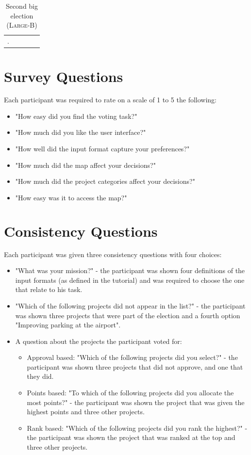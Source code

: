 \documentclass[letterpaper]{article} %
\begin{document}
\begin{longtable}[ht!]{|p{2cm}|p{8cm}|p{3cm}|p{1cm}|p{2cm}|}
     \hline
  \caption{Second big election (\textsc{Large-B})}\label{tab:fourth_elc}.
\end{longtable}


\section{Survey Questions}
Each participant was required to rate on a scale of 1 to 5 the following:

\begin{itemize}
    \item "How easy did you find the voting task?"
    \item "How much did you like the user interface?"
    \item "How well did the input format capture your preferences?"
    \item "How much did the map affect your decisions?"
    \item "How much did the project categories affect your decisions?"
    \item "How easy was it to access the map?"
\end{itemize}

\section{Consistency Questions}
Each participant was given three consistency questions with four choices:
\begin{itemize}
    \item "What was your mission?" - the participant was shown four definitions of the input formats (as defined in the tutorial) and was required to choose the one that relate to his task.
    \item "Which of the following projects did not appear in the list?" - the participant was shown three projects that were part of the election and a fourth option "Improving parking at the airport". 
    \item A question about the projects the participant voted for:
    \begin{itemize}
        \item Approval based: "Which of the following projects did you select?" - the participant was shown three projects that did not approve, and one that they did. 
        \item Points based: "To which of the following projects did you allocate the most points?" - the participant was shown the project that was given the highest points and three other projects.
        \item Rank based: "Which of the following projects did you rank the highest?" - the participant was shown the project that was ranked at the top and three other projects.
    \end{itemize}
\end{itemize}
\end{document}
